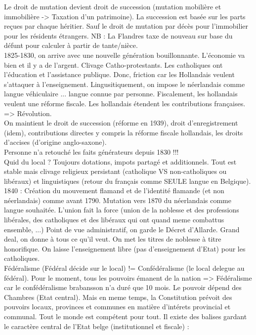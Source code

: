 \documentclass{book}
\begin{document}
Le droit de mutation devient droit de succession (mutation mobilière et immobilière -> Taxation d'un patrimoine). La succession est basée sur les parts reçues par chaque héritier. Sauf le droit de mutation par décès pour l'immobilier pour les résidents étrangers. NB : La Flandres taxe de nouveau sur base du défunt pour calculer à partir de tante/nièce.\\

1825-1830, on arrive avec une nouvelle génération bouillonnante. L'économie va bien et il y a de l'argent. Clivage Catho-protestants. Les catholiques ont l'éducation et l'assistance publique. Donc, friction car les Hollandais veulent s'attaquer à l'enseignement. Lingusitiquement, on impose le néerlandais comme langue véhiculaire ... langue connue par personne. Fiscalement, les hollandais veulent une réforme fiscale. Les hollandais étendent les contributions françaises. => Révolution.\\

On maintient le droit de succession (réforme en 1939), droit d'enregistrement (idem), contributions directes y compris la réforme fiscale hollandais, les droits d'accises (d'origine anglo-saxone).\\

Personne n'a retouché les faits générateurs depuis 1830 !!!\\

Quid du local ? Toujours dotations, impots partagé et additionnels. Tout est stable mais clivage religieux persistant (catholique VS non-catholiques ou libéraux) et linguistiques (retour du français comme SEULE langue en Belgique). 1840 : Création du mouvement flamand et de l'identité flamande (et non néerlandais) comme avant 1790. Mutation vers 1870 du néerlandais comme langue souhaitée. L'union fait la force (union de la noblesse et des professions libérales, des catholiques et des libéraux qui ont quand meme combattus ensemble, ...) Point de vue administratif, on garde le Décret d'Allarde. Grand deal, on donne à tous ce qu'il veut. On met les titres de noblesse à titre honorifique. On laisse l'enseignement libre (pas d'enseignement d'Etat) pour les catholiques.\\

Fédéralisme (Fédéral décide sur le local) != Confédéralisme (le local delegue au fédéral). Pour le moment, tous les pouvoirs émanent de la nation => Fédéralisme car le confédéralisme brabansson n'a duré que 10 mois. Le pouvoir dépend des Chambres (Etat central). Mais en meme temps, la Constitution prévoit des pouvoirs locaux, provinces et communes en matière d'intérets provincial et communal. Tout le monde est compétent pour tout. Il existe des balises gardant le caractère central de l'Etat belge (institutionnel et fiscale) :
\end{document}
